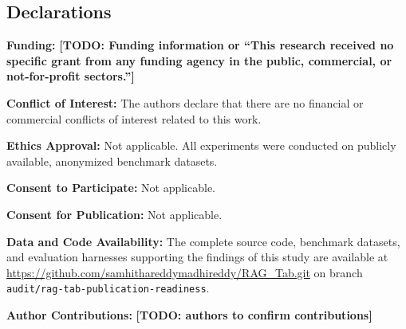 \documentclass[sn-basic]{sn-jnl}
\begin{document}
\begin{backmatter}
\section*{Declarations}

\textbf{Funding:} \textbf{[TODO: Funding information or ``This research received no specific grant from any funding agency in the public, commercial, or not-for-profit sectors.'']}

\textbf{Conflict of Interest:} The authors declare that there are no financial or commercial conflicts of interest related to this work.

\textbf{Ethics Approval:} Not applicable. All experiments were conducted on publicly available, anonymized benchmark datasets.

\textbf{Consent to Participate:} Not applicable.

\textbf{Consent for Publication:} Not applicable.

\textbf{Data and Code Availability:} The complete source code, benchmark datasets, and evaluation harnesses supporting the findings of this study are available at \url{https://github.com/samhithareddymadhireddy/RAG_Tab.git} on branch \texttt{audit/rag-tab-publication-readiness}.

\textbf{Author Contributions:} \textbf{[TODO: authors to confirm contributions]}

\end{backmatter}


\end{document}
